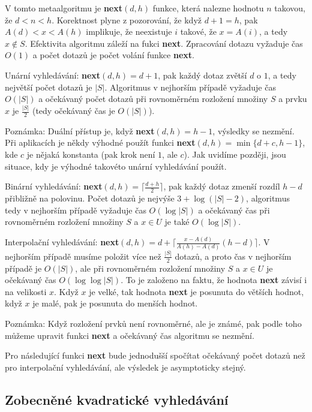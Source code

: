 \documentclass[a4paper,12pt]{article}
\begin{document}
V tomto metaalgoritmu je {\bf next$(d,h)$} funkce, která 
nalezne hodnotu $n$ takovou, že $d<n<h$. Korektnost plyne 
z pozorování, že když $d+1=h$, pak $A(d)<x<A(h)$ 
implikuje, že neexistuje $i$ takové, že $x=A(i)$, a tedy 
$x\notin S$. Efektivita algoritmu záleží na fukci {\bf next}. 
Zpracování dotazu vyžaduje čas $O(1)$ a počet 
dotazů je 
počet volání funkce {\bf next}. 

Unární vyhledávání: {\bf next$(d,h)=d+1$}, pak každý 
dotaz zvětší $d$ o $1$, a tedy největší počet 
dotazů je $|S|$. Algoritmus v nej\-horším případě 
vyžaduje čas $O(|S|)$ a očekávaný počet dotazů při 
rovnoměrném rozložení množiny $S$ a prvku $x$ je $\frac {
|S|}2$ 
(tedy očekávaný čas je $O(|S|)$). 

Poznámka: Duální přístup je, když 
{\bf next$(d,h)=h-1$}, výsled\-ky se nezmění. Při aplikacích je 
někdy výhodné použít funkci {\bf next$(d,h)=\min\{d
+c,h-1\}$}, 
kde $c$ je nějaká konstanta (pak krok není $1$, ale $c$). Jak 
uvidíme později, jsou situace, kdy je výhodné  
takovéto unární vyhledávání použít.

Binární vyhledávání: {\bf next$(d,h)=\lceil\frac {
d+h}2\rceil$}, pak 
každý dotaz zmenší rozdíl $h-d$ přibližně na polovinu. 
Počet dotazů je nejvýše $3+\log(|S|-2)$, 
algoritmus tedy v 
nejhorším případě vyžaduje čas $O(\log|S|)$ a  
očekávaný čas při rovnoměrném roz\-ložení množiny $
S$ a 
$x\in U$ je také $O(\log|S|)$.

Interpolační vyhledávání: 
{\bf next$(d,h)=d+\lceil\frac {x-A(d)}{A(h)-A(d)}(h-d)\rceil$}. V nejhorším případě 
musíme položit více než $\frac {|S|}2$ dotazů, a proto čas 
v nejhorším případě je $O(|S|)$, ale při rovnoměrném 
roz\-ložení množiny $S$ a $x\in U$ je očekávaný čas 
$O(\log\log|S|)$. To je založeno na faktu, že hodnota {\bf next }
závisí i na velikosti $x$. Když $x$ je velké, tak hodnota 
{\bf next} je posunuta do větších hodnot, když $x$ je malé, 
pak je posunuta do menších hodnot.

Poznámka: Když rozložení prvků není 
rovnoměrné, ale je zná\-mé, pak podle toho můžeme  
upravit funkci {\bf next} a očekávaný čas algoritmu se 
nezmění.

Pro následující funkci {\bf next} bude 
jednodušší spočítat očekáva\-ný počet dotazů než 
pro interpolační vyhledávání, ale výsledek je 
asymptoticky stejný.

\subsection{Zobecněné kvadratické vyhledávání}
\end{document}
